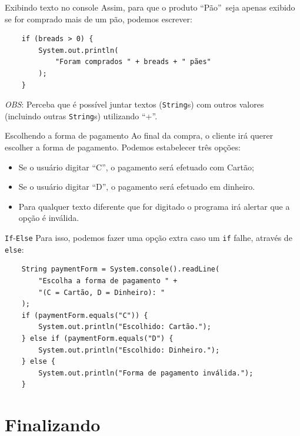 \documentclass{beamer}
\begin{document}
\begin{frame}[fragile]{Exibindo texto no console}
    Assim, para que o produto ``Pão''\ seja apenas exibido se for comprado mais
    de um pão, podemos escrever:

    \begin{verbatim}
    if (breads > 0) {
        System.out.println(
            "Foram comprados " + breads + " pães"
        );
    }
    \end{verbatim}

    \emph{OBS}: Perceba que é possível juntar textos (\texttt{String}s) com
    outros valores (incluindo outras \texttt{String}s) utilizando ``+''.
\end{frame}

\begin{frame}{Escolhendo a forma de pagamento}
    Ao final da compra, o cliente irá querer escolher a forma de pagamento.
    Podemos estabelecer três opções:

    \begin{itemize}
        \item Se o usuário digitar ``C'', o pagamento será efetuado com Cartão;
        \item Se o usuário digitar ``D'', o pagamento será efetuado em dinheiro.
        \item Para qualquer texto diferente que for digitado o programa irá
            alertar que a opção é inválida.
    \end{itemize}
\end{frame}

\begin{frame}[fragile]{\texttt{If}-\texttt{Else}}
    Para isso, podemos fazer uma opção extra caso um \texttt{if} falhe, através
    de \texttt{else}:

    \begin{verbatim}
    String paymentForm = System.console().readLine(
        "Escolha a forma de pagamento " +
        "(C = Cartão, D = Dinheiro): "
    );
    if (paymentForm.equals("C")) {
        System.out.println("Escolhido: Cartão.");
    } else if (paymentForm.equals("D") {
        System.out.println("Escolhido: Dinheiro.");
    } else {
        System.out.println("Forma de pagamento inválida.");
    }
    \end{verbatim}
\end{frame}

\section{Finalizando}
\end{document}
